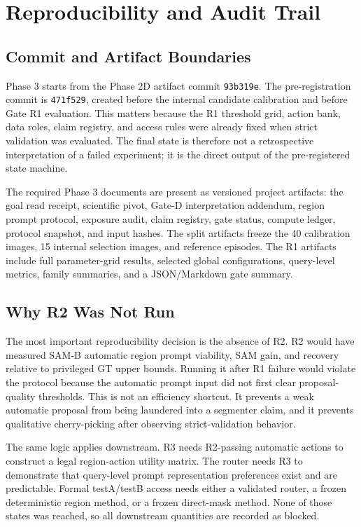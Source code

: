 \section{Reproducibility and Audit Trail}

\subsection{Commit and Artifact Boundaries}

Phase 3 starts from the Phase 2D artifact commit \texttt{93b319e}. The pre-registration commit is \texttt{471f529}, created before the internal candidate calibration and before Gate R1 evaluation. This matters because the R1 threshold grid, action bank, data roles, claim registry, and access rules were already fixed when strict validation was evaluated. The final state is therefore not a retrospective interpretation of a failed experiment; it is the direct output of the pre-registered state machine.

The required Phase 3 documents are present as versioned project artifacts: the goal read receipt, scientific pivot, Gate-D interpretation addendum, region prompt protocol, exposure audit, claim registry, gate status, compute ledger, protocol snapshot, and input hashes. The split artifacts freeze the 40 calibration images, 15 internal selection images, and reference episodes. The R1 artifacts include full parameter-grid results, selected global configurations, query-level metrics, family summaries, and a JSON/Markdown gate summary.

\subsection{Why R2 Was Not Run}

The most important reproducibility decision is the absence of R2. R2 would have measured SAM-B automatic region prompt viability, SAM gain, and recovery relative to privileged GT upper bounds. Running it after R1 failure would violate the protocol because the automatic prompt input did not first clear proposal-quality thresholds. This is not an efficiency shortcut. It prevents a weak automatic proposal from being laundered into a segmenter claim, and it prevents qualitative cherry-picking after observing strict-validation behavior.

The same logic applies downstream. R3 needs R2-passing automatic actions to construct a legal region-action utility matrix. The router needs R3 to demonstrate that query-level prompt representation preferences exist and are predictable. Formal testA/testB access needs either a validated router, a frozen deterministic region method, or a frozen direct-mask method. None of those states was reached, so all downstream quantities are recorded as blocked.

